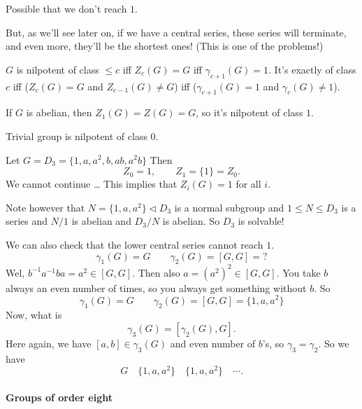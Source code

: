 Possible that we don't reach $1$.


But, as we'll see later on, if we have a central series, these series will terminate, and even more, they'll be the shortest ones!
(This is one of the problems!) 


\begin{corollary}
    $G$ is nilpotent of class $\le c$ iff $Z_c(G) = G$ iff  $\gamma_{c+1}(G) = 1$.
    It's exactly of class $c$ iff ($Z_c(G) = G$ and  $Z_{c-1}(G) \neq G$) iff ($\gamma_{c+1}(G) = 1$ and $\gamma_c(G) \neq 1$).
\end{corollary}


\begin{eg}
    If $G$ is abelian, then $ Z_1(G) = Z(G) = G$, so it's nilpotent of class $1$.
\end{eg}
\begin{eg}
    Trivial group is nilpotent of class $0$.
\end{eg}

\begin{eg}
    Let $G = D_3 = \{1, a, a^2, b, ab, a^2b\} $
    Then
    \[
    Z_0 = 1,
    \qquad Z_1 = \{1\} = Z_0
    .\] 
    We cannot continue \ldots
    This implies that $Z_i(G) = 1$ for all  $i$.

    Note however that  $N = \{1, a, a^2\}\triangleleft D_3 $ is a normal subgroup and $1\le N \le D_3$ is a series and $N / 1$ is abelian and  $ D_3 / N$ is abelian. So $ D_3$ is solvable!

    We can also check that the lower central series cannot reach $1$.
    \[
        \gamma_1(G) = G \qquad \gamma_2(G) = [G, G] = ?
    \] 
    Wel, $b^{-1} a^{-1} b a = a^2 \in [G, G]$. Then also $a = (a^2)^2 \in [G, G]$.
    You take $b$ always an even number of times, so you always get something without  $b$.
    So
    \[
        \gamma_1(G) = G \qquad \gamma_2(G) = [G, G] = \{1, a, a^2\} 
    \] 
    Now, what is 
    \[
        \gamma_3(G) = [\gamma_2(G), G]
    .\] 
    Here again, we have $[a, b] \in \gamma_3(G)$ and even number of $b$'s, so $\gamma_3 = \gamma_2$.
    So we have
    \[
    G \quad \{1, a, a^2\}  \quad \{1, a, a^2\}  \quad \cdots
    .\] 
\end{eg}



\paragraph{Groups of order eight}

